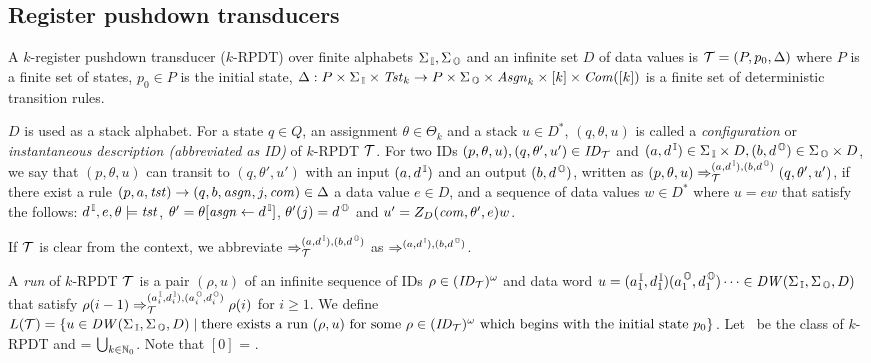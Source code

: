 \subsection{Register pushdown transducers}
\begin{definition}
A $k$-{register pushdown transducer} ($k$-RPDT) over finite alphabets $\Sigma_{\, \mathbb{I}},\Sigma_{\, \mathbb{O}}$ and an infinite set $D$ of data values is
${\cal T}=(P, p_0, \Delta)$ where
$P$ is a finite set of states,
$p_0\in P$ is the initial state,
$\Delta: P\times\Sigma_{\, \mathbb{I}}\times\mathit{Tst}_k \to P\times\Sigma_{\, \mathbb{O}}\times \mathit{Asgn}_k \times [k]\times \mathit{Com}([k])$ is a finite set of deterministic transition rules.
\end{definition}
$D$ is used as a stack alphabet.
For a state $q\in Q$, an assignment $\theta\in\Theta_k$ and a stack $u\in D^*$,
$(q,\theta,u)$ is called
a {\em configuration} or {\em instantaneous description (abbreviated as ID)} of $k$-RPDT ${\cal T}$.
For two IDs $(p, \theta, u), (q, \theta', u')\in \mathit{ID}_{\cal T}$ and $(a,d^{\, \mathbb{I}})\in\Sigma_{\, \mathbb{I}}\times D, (b,d^{\, \mathbb{O}})\in \Sigma_{\, \mathbb{O}}\times D$,
we say that $(p, \theta, u)$ can transit to $(q, \theta', u')$ with an input $(a,d^{\, \mathbb{I}})$ and an output $(b,d^{\, \mathbb{O}})$, written as $(p, \theta, u) \Rightarrow_{{\cal T}}^{(a,d^{\, \mathbb{I}}), (b,d^{\, \mathbb{O}})}(q, \theta', u')$, if there exist a rule $(p, a, \mathit{tst}) \to (q, b, \mathit{asgn}, j, \mathit{com}) \in \Delta$
a data value $e\in D$, and a sequence of data values $w\in D^*$ where $u=ew$
that satisfy the follows:
$d^{\, \mathbb{I}}, e, \theta\models\mathit{tst}$, $\theta' = \theta[\mathit{asgn}\leftarrow d^{\, \mathbb{I}}]$, $\theta'(j) = d^{\, \mathbb{O}}$ and $u'= Z_D(\mathit{com},\theta',e)w$.

If ${\cal T}$ is clear from the context,
we abbreviate
$\Rightarrow_{{\cal T}}^{(a,d^{\, \mathbb{I}}), (b,d^{\, \mathbb{O}})}$ as $\Rightarrow^{(a,d^{\, \mathbb{I}}), (b,d^{\, \mathbb{O}})}$.

A {\em run} of $k$-RPDT ${\cal T}$ is a pair $(\rho, u)$ of an infinite sequence of IDs $\rho\in (\mathit{ID}_{\cal T})^\omega$ and data word $u = (a^{\, \mathbb{I}}_1,d^{\, \mathbb{I}}_1) (a^{\, \mathbb{O}}_1,d^{\, \mathbb{O}}_1) \cdots \in \mathit{DW}(\Sigma_{\, \mathbb{I}},\Sigma_{\, \mathbb{O}},D)$ that satisfy
$\rho(i-1)\Rightarrow_{\cal T}^{(a^{\, \mathbb{I}}_i,d^{\, \mathbb{I}}_i), (a^{\, \mathbb{O}}_i,d^{\, \mathbb{O}}_i)}\rho(i)$ for $i\geq 1$.
We define $L({\cal T}) = \{u\in \mathit{DW}(\Sigma_{\, \mathbb{I}},\Sigma_{\, \mathbb{O}},D) \mid
\text{there exists a run $(\rho, u)$ for some $\rho\in(\mathit{ID}_{\cal T})^\omega$ which begins with the initial state $p_0$}\}$.
Let \RPDTk\ be the class of $k$-RPDT and \RPDT = $\bigcup_{k\in\mathbb{N}_0}$\RPDTk.
Note that \RPDT$[0]$ = \PDT.

